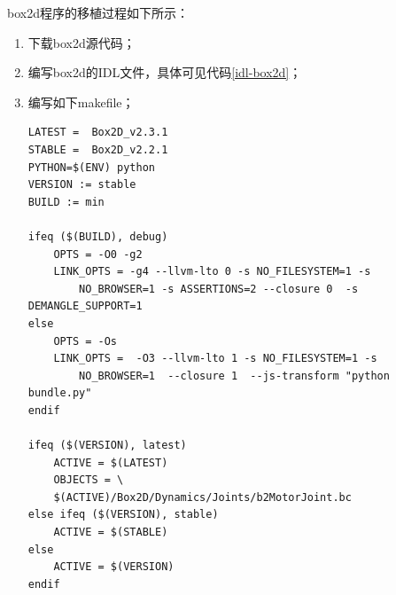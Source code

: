 box2d程序的移植过程如下所示：

\begin{enumerate}[itemindent=2em]
    \item 下载box2d源代码；
    \item 编写box2d的IDL文件，具体可见代码\ref{idl-box2d}；
    \item 编写如下makefile；
\begin{verbatim}
LATEST =  Box2D_v2.3.1
STABLE =  Box2D_v2.2.1
PYTHON=$(ENV) python
VERSION := stable
BUILD := min

ifeq ($(BUILD), debug)
	OPTS = -O0 -g2
	LINK_OPTS = -g4 --llvm-lto 0 -s NO_FILESYSTEM=1 -s 
		NO_BROWSER=1 -s ASSERTIONS=2 --closure 0  -s DEMANGLE_SUPPORT=1 
else
	OPTS = -Os
	LINK_OPTS =  -O3 --llvm-lto 1 -s NO_FILESYSTEM=1 -s 
		NO_BROWSER=1  --closure 1  --js-transform "python bundle.py"
endif

ifeq ($(VERSION), latest)
	ACTIVE = $(LATEST)
	OBJECTS = \
	$(ACTIVE)/Box2D/Dynamics/Joints/b2MotorJoint.bc
else ifeq ($(VERSION), stable)
	ACTIVE = $(STABLE)
else
	ACTIVE = $(VERSION)
endif



\end{verbatim}
\end{enumerate}
